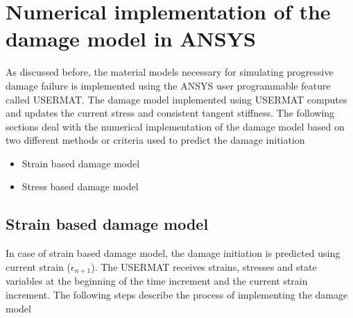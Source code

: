 \documentclass[a4paper,12pt,twoside]{report}
\begin{document}
\section{Numerical implementation of the damage model in ANSYS}
\indent\indent\indent  As discussed before, the material models necessary for simulating progressive damage failure is implemented using the ANSYS user programmable feature called USERMAT. The damage model implemented using USERMAT computes and updates the current stress and consistent tangent stiffness. The following sections deal with the numerical implementation of the damage model based on two different methods or criteria used to predict the damage initiation\\
\begin{itemize}
\item Strain based damage model 
\item Stress based damage model 
\end{itemize}
\subsection{Strain based damage model}
\indent\indent\indent  In case of strain based damage model, the damage initiation is predicted using current strain ($\epsilon_{n+1}$).   The USERMAT receives strains, stresses and state variables at the beginning of the time increment and the current strain increment. The following steps describe the process of implementing the damage model
\end{document}
